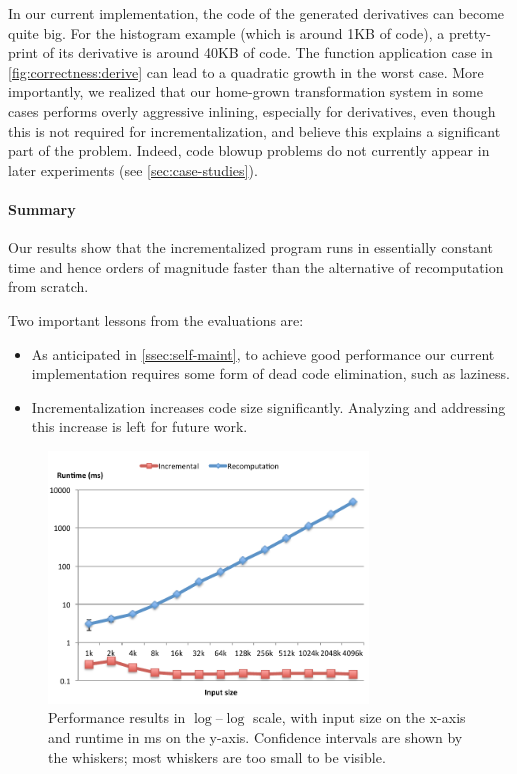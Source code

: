 In our current implementation, the code of the generated
derivatives can become quite big. For the histogram example
(which is around 1KB of code), a pretty-print of its derivative
is around 40KB of code. The function application case in
\cref{fig:correctness:derive} can lead to a quadratic growth in
the worst case. More importantly, we realized that our home-grown
transformation system in some cases performs overly aggressive
inlining, especially for derivatives, even though this is not
required for incrementalization, and believe this explains a
significant part of the problem. Indeed, code blowup problems do
not currently appear in later experiments (see
\cref{sec:case-studies}).

\paragraph{Summary}
Our results show that the incrementalized program runs
in essentially constant time and hence orders of magnitude faster than
the alternative of recomputation from scratch.

Two important lessons from the evaluations are:
\begin{itemize}
\item As anticipated in \cref{ssec:self-maint}, to achieve good performance our current
  implementation requires some form of dead code elimination, such as laziness.
\item Incrementalization increases code size significantly.
  Analyzing and addressing this increase is left for future work.
\end{itemize}

\begin{figure}
\includegraphics[keepaspectratio,width=8.5cm]{pldi14/HistogramGenerated-new.pdf}
\caption[Performance results in $\log$--$\log$ scale]
{Performance results in $\log$--$\log$ scale, with input size on
  the x-axis and runtime in ms on the y-axis. Confidence
  intervals are shown by the whiskers; most whiskers are
  too small to be visible.}
\label{fig:graph}
\end{figure}
